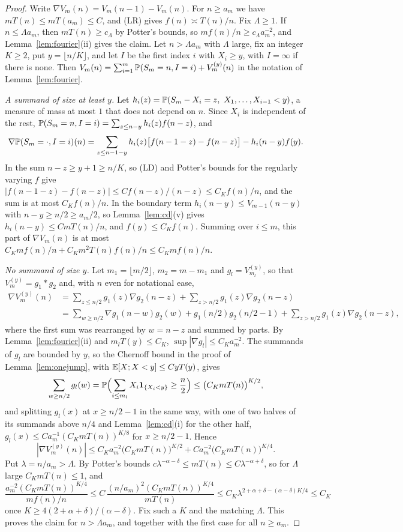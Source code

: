 \begin{proof}
Write $\nabla V_m(n)=V_m(n-1)-V_m(n)$. For $n\ge a_m$ we have $mT(n)\le mT(a_m)\le C$, and (LR)
gives $f(n)\asymp T(n)/n$. Fix $\Lambda\ge1$. If $n\le\Lambda a_m$, then $mT(n)\ge c_\Lambda$ by
Potter's bounds, so $mf(n)/n\ge c_\Lambda a_m^{-2}$, and Lemma~\ref{lem:fourier}(ii) gives the claim.
Let $n>\Lambda a_m$ with $\Lambda$ large, fix an integer $K\ge2$, put $y=\lfloor n/K\rfloor$, and let
$I$ be the first index $i$ with $X_i\ge y$, with $I=\infty$ if there is none. Then
$V_m(n)=\sum_{i=1}^m\mathbb{P}(S_m=n,I=i)+V^{(y)}_m(n)$ in the notation of Lemma~\ref{lem:fourier}.

\emph{A summand of size at least $y$.} Let $h_i(z)=\Prob(S_m-X_i=z,\ X_1,\dots,X_{i-1}<y)$, a
measure of mass at most $1$ that does not depend on $n$. Since $X_i$ is independent of the rest,
$\mathbb{P}(S_m=n,I=i)=\sum_{z\le n-y}h_i(z)f(n-z)$, and
\[
 \nabla\mathbb{P}(S_m=\cdot,I=i)(n)=\sum_{z\le n-1-y}h_i(z)\bigl[f(n-1-z)-f(n-z)\bigr]-h_i(n-y)f(y).
\]
In the sum $n-z\ge y+1\ge n/K$, so (LD) and Potter's bounds for the regularly varying $f$ give
$|f(n-1-z)-f(n-z)|\le Cf(n-z)/(n-z)\le C_Kf(n)/n$, and the sum is at most $C_Kf(n)/n$. In the
boundary term $h_i(n-y)\le V_{m-1}(n-y)$ with $n-y\ge n/2\ge a_m/2$, so Lemma~\ref{lem:cd}(v) gives
$h_i(n-y)\le CmT(n)/n$, and $f(y)\le C_Kf(n)$. Summing over $i\le m$, this part of $\nabla V_m(n)$ is
at most $C_Kmf(n)/n+C_Km^2T(n)f(n)/n\le C_Kmf(n)/n$.

\emph{No summand of size $y$.} Let $m_1=\lfloor m/2\rfloor$, $m_2=m-m_1$ and $g_l=V^{(y)}_{m_l}$, so
that $V^{(y)}_m=g_1*g_2$ and, with $n$ even for notational ease,
\begin{align*}
 \nabla V^{(y)}_m(n)&=\sum_{z\le n/2}g_1(z)\nabla g_2(n-z)+\sum_{z>n/2}g_1(z)\nabla g_2(n-z)\\
 &=\sum_{w\ge n/2}\nabla g_1(n-w)g_2(w)+g_1(n/2)g_2(n/2-1)+\sum_{z>n/2}g_1(z)\nabla g_2(n-z),
\end{align*}
where the first sum was rearranged by $w=n-z$ and summed by parts. By Lemma~\ref{lem:fourier}(ii)
and $m_lT(y)\le C_K$, $\sup|\nabla g_l|\le C_Ka_m^{-2}$. The summands of $g_l$ are bounded by $y$, so
the Chernoff bound in the proof of Lemma~\ref{lem:onejump}, with $\mathbb{E}[X;X<y]\le CyT(y)$, gives
\[
 \sum_{w\ge n/2}g_l(w)=\mathbb{P}\Bigl(\sum_{i\le m_l}X_i\mathbf{1}_{\{X_i<y\}}\ge\frac n2\Bigr)\le\bigl(C_KmT(n)\bigr)^{K/2},
\]
and splitting $g_l(x)$ at $x\ge n/2-1$ in the same way, with one of two halves of its summands above
$n/4$ and Lemma~\ref{lem:cd}(i) for the other half, $g_l(x)\le Ca_m^{-1}(C_KmT(n))^{K/8}$ for
$x\ge n/2-1$. Hence
\[
 |\nabla V^{(y)}_m(n)|\le C_Ka_m^{-2}\bigl(C_KmT(n)\bigr)^{K/2}+Ca_m^{-2}\bigl(C_KmT(n)\bigr)^{K/4}.
\]
Put $\lambda=n/a_m>\Lambda$. By Potter's bounds $c\lambda^{-\alpha-\delta}\le mT(n)\le C\lambda^{-\alpha+\delta}$,
so for $\Lambda$ large $C_KmT(n)\le1$, and
\[
 \frac{a_m^{-2}(C_KmT(n))^{K/4}}{mf(n)/n}\le C\,\frac{(n/a_m)^2(C_KmT(n))^{K/4}}{mT(n)}
 \le C_K\lambda^{2+\alpha+\delta-(\alpha-\delta)K/4}\le C_K
\]
once $K\ge4(2+\alpha+\delta)/(\alpha-\delta)$. Fix such a $K$ and the matching $\Lambda$. This proves
the claim for $n>\Lambda a_m$, and together with the first case for all $n\ge a_m$.
\end{proof}

